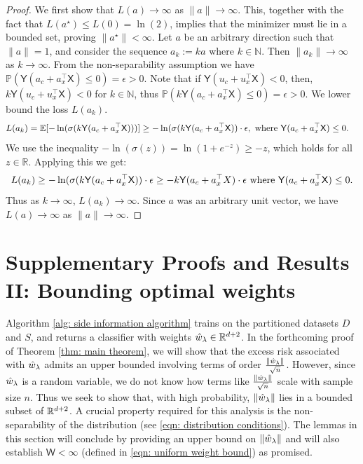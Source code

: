 \begin{proof}
We first show that $L(a) \to \infty$ as $\|a\| \to \infty$. This, together with the fact that $L(a^\star) \leq L(0) = \ln(2)$, implies that the minimizer must lie in a bounded set, proving $\|a^\star\| < \infty$.
Let $a$ be an arbitrary direction such that $\|a\|=1$, and consider the sequence $a_k := k a$ where $k \in \mathbb{N}$. Then $\|a_k\| \to \infty$ as $k \to \infty$.
From the non-separability assumption we have $\mathbb{P}(\mathsf{Y}(a_c + a_x^\top \mathsf{X}) \le 0) = \epsilon > 0$. Note that if $\mathsf{Y}(u_c + u_x^\top \mathsf{X}) < 0$, then,  $k\mathsf{Y}(u_c + u_x^\top \mathsf{X}) < 0$ for $k \in \mathbb{N}$, thus $\mathbb{P}(k\mathsf{Y}(a_c + a_x^\top \mathsf{X}) \le 0) = \epsilon > 0$.
We lower bound the loss $L(a_k)$.
\begin{align*}
    L(a_k) &= \mathbb{E}[-\ln(\sigma(k \mathsf{Y}(a_c + a_x^\top \mathsf{X})))] \geq -\ln(\sigma(k \mathsf{Y}(a_c + a_x^\top \mathsf{X}))\cdot \epsilon, \text{ where } \mathsf{Y}(a_c + a_x^\top \mathsf{X}) \le 0.
\end{align*}
We use the inequality $-\ln(\sigma(z)) = \ln(1+e^{-z}) \geq -z$, which holds for all $z \in \mathbb{R}$. Applying this we get:
\begin{equation*}
    \begin{aligned}
    L(a_k) \geq -\ln(\sigma(k \mathsf{Y}(a_c + a_x^\top \mathsf{X}))\cdot \epsilon \geq -k\mathsf{Y}(a_c + a_x^\top X)\cdot \epsilon \text{ where } \mathsf{Y}(a_c + a_x^\top \mathsf{X}) \le 0.
    \end{aligned}
\end{equation*}
Thus as $k \to \infty$, $L(a_k) \to \infty$.
Since $a$ was an arbitrary unit vector, we have $L(a) \to \infty$ as $\|a\| \to \infty$.
\end{proof}

\section{Supplementary Proofs and Results II: Bounding optimal weights}\label{sec: Bounding optimal weights}

Algorithm \ref{alg: side information algorithm} trains on the partitioned datasets $D$ and $S$, and returns a classifier with weights $\hat{w}_\lambda \in \mathbb{R}^{d+2}$. In the forthcoming proof of Theorem \ref{thm: main theorem}, we will show that the excess risk associated with $\hat{w}_\lambda$ admits an upper bounded involving terms of order $\frac{\|\hat{w}_\lambda\|}{\sqrt{n}}$. However, since $\hat{w}_\lambda$ is a random variable, we do not know how terms like $\frac{\|\hat{w}_\lambda\|}{\sqrt{n}}$ scale with sample size $n$. Thus we seek to show that, with high probability, $\|\hat{w}_\lambda\|$ lies in a bounded subset of $\mathbb{R}^{d+2}$. A crucial property required for this analysis is the non-separability of the distribution (see \eqref{eqn: distribution conditions}). The lemmas in this section will conclude by providing an upper bound on $\|\hat{w}_\lambda\|$ and will also establish $\mathsf{W} < \infty$ (defined in \eqref{eqn: uniform weight bound}) as promised.


